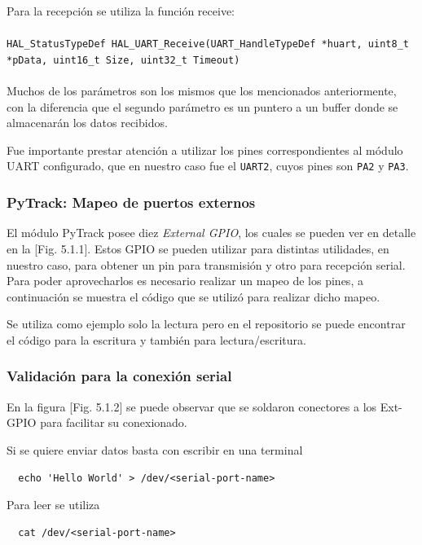 \documentclass[12pt]{article}
\begin{document}
Para la recepción se utiliza la función receive:
\\\\
\lstinline|HAL_StatusTypeDef HAL_UART_Receive(UART_HandleTypeDef *huart, uint8_t *pData, uint16_t Size, uint32_t Timeout)|
\\\\
Muchos de los parámetros son los mismos que los mencionados anteriormente, con la diferencia que el segundo parámetro es un puntero a un buffer donde se almacenarán los datos recibidos.

Fue importante prestar atención a utilizar los pines correspondientes al módulo UART configurado, que en nuestro caso fue el \texttt{UART2}, cuyos pines son \texttt{PA2} y \texttt{PA3}.

\subsubsection{PyTrack: Mapeo de puertos externos}
El módulo PyTrack posee diez \textit{External GPIO}, los cuales se pueden ver en detalle en la [Fig. 5.1.1]. Estos GPIO se pueden utilizar para distintas utilidades, en nuestro caso, para obtener un pin para transmisión y otro para recepción serial. Para poder aprovecharlos es necesario realizar un mapeo de los pines, a continuación se muestra el código que se utilizó para realizar dicho mapeo.



Se utiliza como ejemplo solo la lectura pero en el repositorio se puede encontrar el código para la escritura y también para lectura/escritura.

\subsubsection{Validación para la conexión serial}

En la figura [Fig. 5.1.2] se puede observar que se soldaron conectores a los Ext-GPIO para facilitar su conexionado.

Si se quiere enviar datos basta con escribir en una terminal
\lstset{language=Bash}
\begin{lstlisting}
  echo 'Hello World' > /dev/<serial-port-name>
\end{lstlisting}

Para leer se utiliza
\begin{lstlisting}
  cat /dev/<serial-port-name>
\end{lstlisting}
\end{document}
